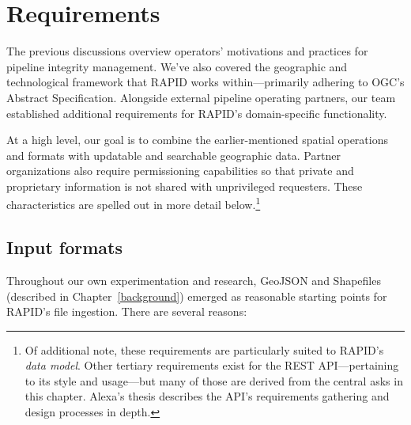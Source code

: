 \chapter{Requirements}
\label{requirements}

The previous discussions overview operators' motivations and practices for pipeline integrity management. We've also covered the geographic and technological framework that RAPID works within---primarily adhering to OGC's Abstract Specification. Alongside external pipeline operating partners, our team established additional requirements for RAPID's domain-specific functionality.

At a high level, our goal is to combine the earlier-mentioned spatial operations and formats with updatable and searchable  geographic data. Partner organizations also require permissioning capabilities so that private and proprietary information is not shared with unprivileged requesters. These characteristics are spelled out in more detail below.\footnote{Of additional note, these requirements are particularly suited to RAPID's \textit{data model}. Other tertiary requirements exist for the REST API---pertaining to its style and usage---but many of those are derived from the central asks in this chapter. Alexa's thesis describes the API's requirements gathering and design processes in depth.}

\section{Input formats}

Throughout our own experimentation and research, GeoJSON and Shapefiles (described in Chapter~\ref{background}) emerged as reasonable starting points for RAPID's file ingestion. There are several reasons:

